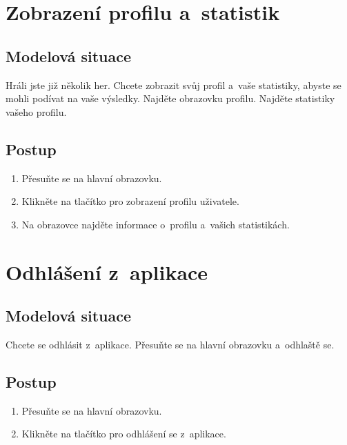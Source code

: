 \section{Zobrazení profilu a~statistik}
\label{scen:profile}

\subsection*{Modelová situace}

Hráli jste již několik her.
Chcete zobrazit svůj profil a~vaše statistiky,
abyste se mohli podívat na vaše výsledky.
Najděte obrazovku profilu.
Najděte statistiky vašeho profilu.

\subsection*{Postup}

\begin{enumerate}
    \item Přesuňte se na hlavní obrazovku.
    \item Klikněte na tlačítko pro zobrazení profilu uživatele.
    \item Na obrazovce najděte informace o~profilu a~vašich statistikách.
\end{enumerate}

\section{Odhlášení z~aplikace}
\label{scen:logout}

\subsection*{Modelová situace}

Chcete se odhlásit z~aplikace.
Přesuňte se na hlavní obrazovku a~odhlaště se.

\subsection*{Postup}

\begin{enumerate}
    \item Přesuňte se na hlavní obrazovku.
    \item Klikněte na tlačítko pro odhlášení se z~aplikace.
\end{enumerate}

